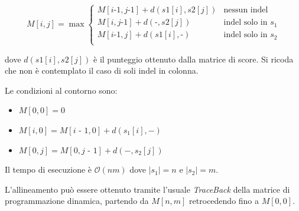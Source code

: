 \begin{equation}
    M[i, j] = \max  {
                    \begin{cases} 
                        M[i \textrm{-} 1,j \textrm{-} 1] +d(s1[i],s2[j]) & \textrm{nessun indel}\\
                        M[i,j \textrm{-} 1] +d(\textrm{-},s2[j]) & \textrm{indel solo in } s_1\\
                        M[i \textrm{-} 1,j] +d(s1[i],\textrm{-}) & \textrm{indel solo in } s_2\\
                    \end{cases}
                    }
\end{equation}

dove $d(s1[i],s2[j])$ è il punteggio ottenuto dalla matrice di score. Si ricoda che non è contemplato il caso di soli indel in colonna.

Le condizioni al contorno sono:

\begin{itemize}
    \item $M[0,0]=0$
    \item $M[i,0]=M[i \textrm{ - } 1,0] + d(s_1[i],-)$
    \item $M[0,j]=M[0,j \textrm{ - } 1] + d(-,s_2[j])$
\end{itemize}

Il tempo di esecuzione è $\mathcal{O}(nm)$ dove $|s_1|=n$ e $|s_2|=m$.

L'allineamento può essere ottenuto tramite l'usuale \textit{TraceBack} della matrice di programmazione dinamica, partendo da $M[n,m]$ retrocedendo fino a $M[0,0]$.

